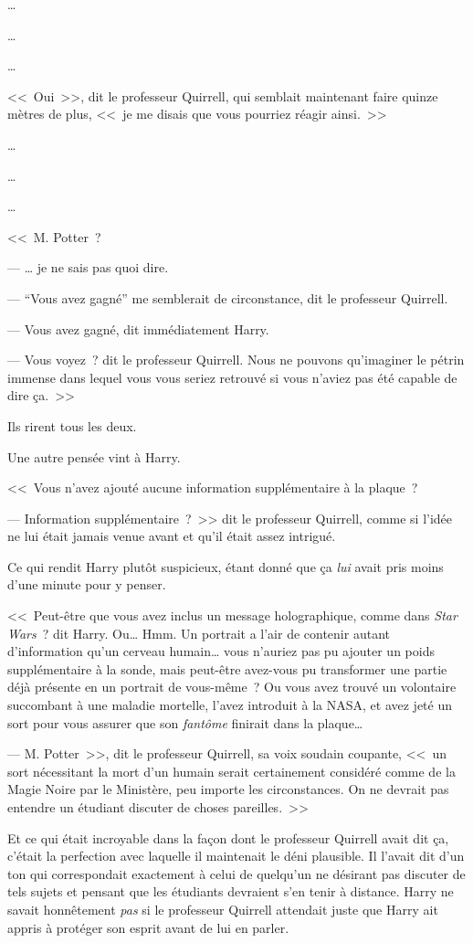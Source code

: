 …

…

…

<<~Oui~>>, dit le professeur Quirrell, qui semblait maintenant faire quinze mètres de plus, <<~je me disais que vous pourriez réagir ainsi.~>>

…

…

…

<<~M. Potter~?

--- … je ne sais pas quoi dire.

--- “Vous avez gagné” me semblerait de circonstance, dit le professeur Quirrell.

--- Vous avez gagné, dit immédiatement Harry.

--- Vous voyez~? dit le professeur Quirrell. Nous ne pouvons qu'imaginer le pétrin immense dans lequel vous vous seriez retrouvé si vous n'aviez pas été capable de dire ça.~>>

Ils rirent tous les deux.

Une autre pensée vint à Harry.

<<~Vous n'avez ajouté aucune information supplémentaire à la plaque~?

--- Information supplémentaire~?~>> dit le professeur Quirrell, comme si l'idée ne lui était jamais venue avant et qu'il était assez intrigué.

Ce qui rendit Harry plutôt suspicieux, étant donné que ça \emph{lui} avait pris moins d'une minute pour y penser.

<<~Peut-être que vous avez inclus un message holographique, comme dans \emph{Star Wars}~? dit Harry. Ou… Hmm. Un portrait a l'air de contenir autant d'information qu'un cerveau humain… vous n'auriez pas pu ajouter un poids supplémentaire à la sonde, mais peut-être avez-vous pu transformer une partie déjà présente en un portrait de vous-même~? Ou vous avez trouvé un volontaire succombant à une maladie mortelle, l'avez introduit à la NASA, et avez jeté un sort pour vous assurer que son \emph{fantôme} finirait dans la plaque…

--- M. Potter~>>, dit le professeur Quirrell, sa voix soudain coupante, <<~un sort nécessitant la mort d'un humain serait certainement considéré comme de la Magie Noire par le Ministère, peu importe les circonstances. On ne devrait pas entendre un étudiant discuter de choses pareilles.~>>

Et ce qui était incroyable dans la façon dont le professeur Quirrell avait dit ça, c'était la perfection avec laquelle il maintenait le déni plausible. Il l'avait dit d'un ton qui correspondait exactement à celui de quelqu'un ne désirant pas discuter de tels sujets et pensant que les étudiants devraient s'en tenir à distance. Harry ne savait honnêtement \emph{pas} si le professeur Quirrell attendait juste que Harry ait appris à protéger son esprit avant de lui en parler.

